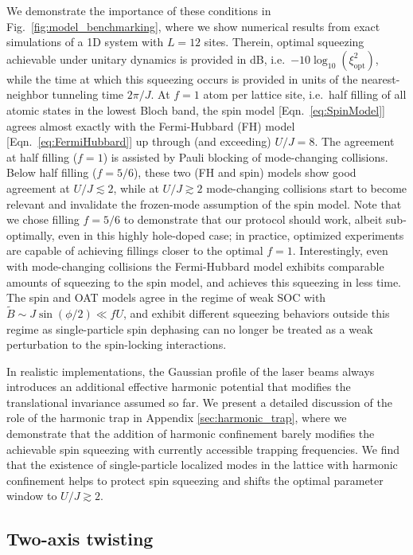 \documentclass[aps,prx,superscriptaddress,notitlepage,twocolumn,longbibliography]{revtex4-2}
\renewcommand{\t}{\text} %
\begin{document}
We demonstrate the importance of these conditions in Fig.~\ref{fig:model_benchmarking}, where we show numerical results from exact simulations of a 1D system with $L=12$ sites.
Therein, optimal squeezing achievable under unitary dynamics is provided in dB, i.e.~$-10\log_{10}(\xi_{\t{opt}}^2)$, while the time at which this squeezing occurs is provided in units of the nearest-neighbor tunneling time $2\pi/J$.
At $f=1$ atom per lattice site, i.e.~half filling of all atomic states in the lowest Bloch band, the spin model [Eqn.~\eqref{eq:SpinModel}] agrees almost exactly with the Fermi-Hubbard (FH) model [Eqn.~\eqref{eq:FermiHubbard}] up through (and exceeding) $U/J=8$. The agreement at half filling ($f=1$) is assisted by Pauli blocking of mode-changing collisions.
Below half filling ($f=5/6$), these two (FH and spin) models show good agreement at $U/J\lesssim2$, while at $U/J\gtrsim2$ mode-changing collisions start to become relevant and invalidate the frozen-mode assumption of the spin model.
Note that we chose filling $f=5/6$ to demonstrate that our protocol should work, albeit sub-optimally, even in this highly hole-doped case; in practice, optimized experiments are capable of achieving fillings closer to the optimal $f=1$\cite{brown2017spinimbalance}.
Interestingly, even with mode-changing collisions the Fermi-Hubbard model exhibits comparable amounts of squeezing to the spin model, and achieves this squeezing in less time.
The spin and OAT models agree in the regime of weak SOC with $\widetilde{B}\sim J\sin(\phi/2)\ll fU$, and exhibit different squeezing behaviors outside this regime as single-particle spin dephasing can no longer be treated as a weak perturbation to the spin-locking  interactions.

In realistic implementations, the Gaussian profile of the laser beams always introduces an additional effective harmonic potential that modifies the translational invariance assumed so far.
We present a detailed discussion of the role of the harmonic trap in Appendix \ref{sec:harmonic_trap}, where we demonstrate that the addition of harmonic confinement barely modifies the achievable spin squeezing with currently accessible trapping frequencies.
We find that the existence of single-particle localized modes in the lattice with harmonic confinement\cite{rey2005ultracold, pupillo2006extended} helps to protect spin squeezing and shifts the optimal parameter window to $U/J\gtrsim 2$.

\subsection{Two-axis twisting}
\label{sec:TAT}
\end{document}
